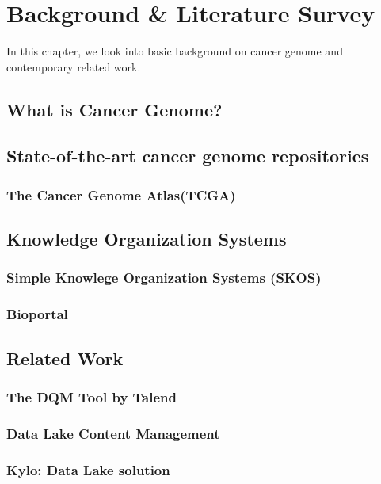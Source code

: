 %

\chapter{Background \& Literature Survey}
\label{relatedwork}
In this chapter, we look into basic background on cancer genome and contemporary related work.
\section{What is Cancer Genome?}

\section{State-of-the-art cancer genome repositories}
\subsection{The Cancer Genome Atlas(TCGA)}
\label{relatedwork.tcga}
\section{Knowledge Organization Systems}
\label{relatedework.kos}
\subsection{Simple Knowlege Organization Systems (SKOS)}
\label{relatedwork.skos}

\subsection{Bioportal}
\label{relatedwork.bioportal}
\section{Related Work}
\subsection{The DQM Tool by Talend}
\subsection{Data Lake Content Management}
\subsection{Kylo: Data Lake solution}







